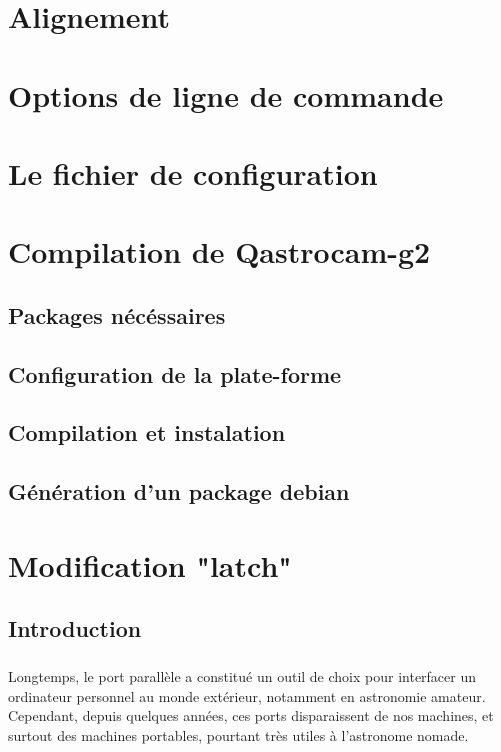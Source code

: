 \documentclass[11pt,a4paper]{book}
\begin{document}
\chapter{Alignement}

\chapter{Options de ligne de commande}

\chapter{Le fichier de configuration}

\appendix

\chapter{Compilation de Qastrocam-g2}

\section{Packages n\'ec\'essaires}

\section{Configuration de la plate-forme}

\section{Compilation et instalation}

\section{G\'en\'eration d'un package debian}

\chapter{Modification "latch"}

\section{Introduction}

\paragraph*{}
Longtemps, le port parall\`ele a constitu\'e un outil de choix pour
interfacer un ordinateur personnel au monde ext\'erieur, notamment en
astronomie amateur. Cependant, depuis quelques ann\'ees, ces ports
disparaissent de nos machines, et surtout des machines portables,
pourtant tr\`es utiles \`a l'astronome nomade.
\end{document}

